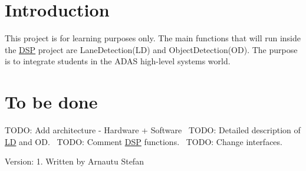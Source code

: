 \hypertarget{index_Introduction}{}\section{Introduction}\label{index_Introduction}
This project is for learning purposes only. The main functions that will run inside the \hyperlink{namespaceDSP}{D\+SP} project are Lane\+Detection(\+L\+D) and Object\+Detection(\+O\+D). The purpose is to integrate students in the A\+D\+AS high-\/level systems world.\hypertarget{index_a}{}\section{To be done}\label{index_a}
T\+O\+DO\+: Add architecture -\/ Hardware + Software~\newline
T\+O\+DO\+: Detailed description of \hyperlink{namespaceLD}{LD} and OD.~\newline
T\+O\+DO\+: Comment \hyperlink{namespaceDSP}{D\+SP} functions.~\newline
T\+O\+DO\+: Change interfaces.

Version\+: 1. Written by Arnautu Stefan 